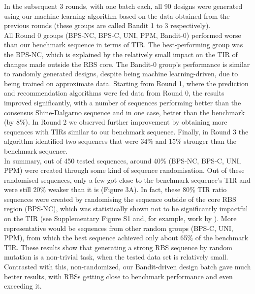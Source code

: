 \documentclass{article}
\begin{document}
In the subsequent 3 rounds, with one batch each, all 90 designs were generated using our machine learning algorithm based on the data obtained from the previous rounds (these groups are called Bandit 1 to 3 respectively).\\

All Round 0 groups (BPS-NC, BPS-C, UNI, PPM, Bandit-0) performed worse than our benchmark sequence in terms of TIR. 
The best-performing group was the BPS-NC, which is explained by the relatively small impact on the TIR of changes made outside the RBS core. 
The Bandit-0 group's performance is similar to randomly generated designs, despite being machine learning-driven, due to being trained on approximate data.
Starting from Round 1, where the prediction and recommendation algorithms were fed data from Round 0, the results improved significantly, with a number of sequences performing better than the consensus Shine-Dalgarno sequence and in one case, better than the benchmark (by 8\%).
In Round 2 we observed further improvement by obtaining more sequences with TIRs similar to our benchmark sequence.
Finally, in Round 3 the algorithm identified two sequences that were 34\% and 15\% stronger than the benchmark sequence.\\

In summary, out of 450 tested sequences, around 40\% (BPS-NC, BPS-C, UNI, PPM) were created through some kind of sequence randomisation. Out of these randomised sequences, only a few got close to the benchmark sequence's TIR and were still 20\% weaker than it is (Figure 3A). In fact, these 80\% TIR ratio sequences were created by randomising the sequence outside of the core RBS region (BPS-NC), which was statistically shown not to be significantly impactful on the TIR (see Supplementary Figure S1 and, for example, work by \mbox{\textcite{Jeschek2016}}). More representative would be sequences from other random groups (BPS-C, UNI, PPM), from which the best sequence achieved only about 65\% of the benchmark TIR. 
These results show that generating a strong RBS sequence by random mutation is a non-trivial task, when the tested data set is relatively small.
Contrasted with this, non-randomized, our Bandit-driven design batch gave much better results, with RBSs getting close to benchmark performance and even exceeding it.\\
\end{document}
